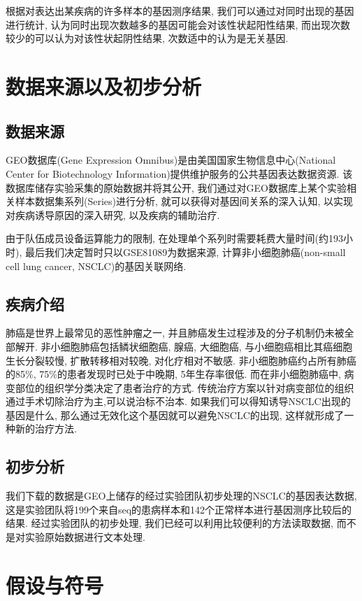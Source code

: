 \documentclass[zihao=-4]{ctexart}
\begin{document}
根据对表达出某疾病的许多样本的基因测序结果, 我们可以通过对同时出现的基因进行统计, 认为同时出现次数越多的基因可能会对该性状起阳性结果, 而出现次数较少的可以认为对该性状起阴性结果, 次数适中的认为是无关基因.


\section{数据来源以及初步分析}
\subsection{数据来源}
GEO数据库(Gene Expression Omnibus)是由美国国家生物信息中心(National Center for Biotechnology Information)提供维护服务的公共基因表达数据资源. 该数据库储存实验采集的原始数据并将其公开, 我们通过对GEO数据库上某个实验相关样本数据集系列(Series)进行分析, 就可以获得对基因间关系的深入认知, 以实现对疾病诱导原因的深入研究, 以及疾病的辅助治疗.

由于队伍成员设备运算能力的限制, 在处理单个系列时需要耗费大量时间(约193小时), 最后我们决定暂时只以GSE81089为数据来源, 计算非小细胞肺癌(non-small cell lung cancer, NSCLC)的基因关联网络.
\subsection{疾病介绍}
肺癌是世界上最常见的恶性肿瘤之一, 并且肺癌发生过程涉及的分子机制仍未被全部解开. 非小细胞肺癌\cite{wiki:NSCLC}包括鳞状细胞癌, 腺癌, 大细胞癌, 与小细胞癌相比其癌细胞生长分裂较慢, 扩散转移相对较晚, 对化疗相对不敏感. 非小细胞肺癌约占所有肺癌的85\%, 75\%的患者发现时已处于中晚期, 5年生存率很低. 而在非小细胞肺癌中, 病变部位的组织学分类决定了患者治疗的方式. 传统治疗方案以针对病变部位的组织通过手术切除治疗为主,可以说治标不治本. 如果我们可以得知诱导NSCLC出现的基因是什么, 那么通过无效化这个基因就可以避免NSCLC的出现, 这样就形成了一种新的治疗方法.
\subsection{初步分析}
我们下载的数据是GEO上储存的经过实验团队初步处理的NSCLC的基因表达数据, 这是实验团队将199个来自seq的患病样本和142个正常样本进行基因测序比较后的结果. 经过实验团队的初步处理, 我们已经可以利用比较便利的方法读取数据, 而不是对实验原始数据进行文本处理. 

\section{假设与符号}
\end{document}
